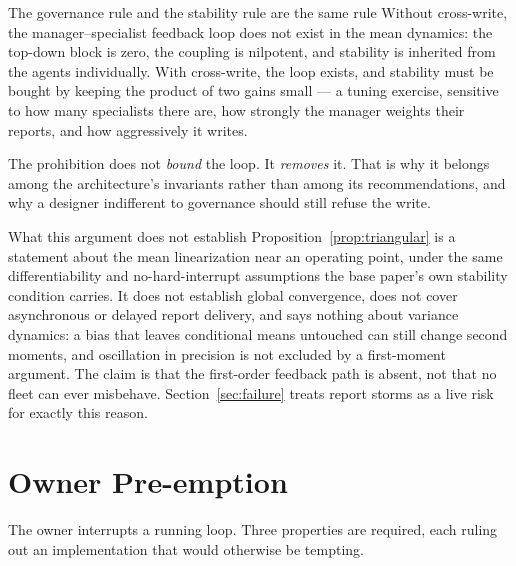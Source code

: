 \documentclass[11pt]{article}
\begin{document}
\begin{claimbox}{The governance rule and the stability rule are the same rule}
Without cross-write, the manager--specialist feedback loop does not exist in the mean dynamics: the top-down block is zero, the coupling is nilpotent, and stability is inherited from the agents individually. With cross-write, the loop exists, and stability must be bought by keeping the product of two gains small --- a tuning exercise, sensitive to how many specialists there are, how strongly the manager weights their reports, and how aggressively it writes.

The prohibition does not \emph{bound} the loop. It \emph{removes} it. That is why it belongs among the architecture's invariants rather than among its recommendations, and why a designer indifferent to governance should still refuse the write.
\end{claimbox}

\begin{cautionbox}{What this argument does not establish}
Proposition~\ref{prop:triangular} is a statement about the mean linearization near an operating point, under the same differentiability and no-hard-interrupt assumptions the base paper's own stability condition carries. It does not establish global convergence, does not cover asynchronous or delayed report delivery, and says nothing about variance dynamics: a bias that leaves conditional means untouched can still change second moments, and oscillation in precision is not excluded by a first-moment argument. The claim is that the first-order feedback path is absent, not that no fleet can ever misbehave. Section~\ref{sec:failure} treats report storms as a live risk for exactly this reason.
\end{cautionbox}

\section{Owner Pre-emption}
\label{sec:interrupt}

The owner interrupts a running loop. Three properties are required, each ruling out an implementation that would otherwise be tempting.
\end{document}
